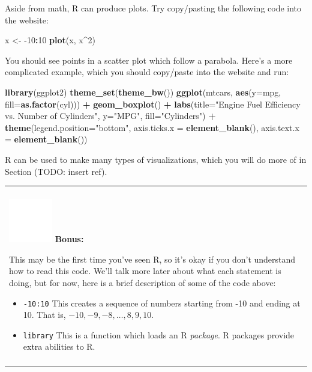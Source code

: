 \documentclass[
]{book}
\newenvironment{Shaded}{\begin{snugshade}}{\end{snugshade}}
\newcommand{\DataTypeTok}[1]{\textcolor[rgb]{0.13,0.29,0.53}{#1}}
\newcommand{\DecValTok}[1]{\textcolor[rgb]{0.00,0.00,0.81}{#1}}
\newcommand{\KeywordTok}[1]{\textcolor[rgb]{0.13,0.29,0.53}{\textbf{#1}}}
\newcommand{\NormalTok}[1]{#1}
\newcommand{\OperatorTok}[1]{\textcolor[rgb]{0.81,0.36,0.00}{\textbf{#1}}}
\newcommand{\StringTok}[1]{\textcolor[rgb]{0.31,0.60,0.02}{#1}}
\providecommand{\tightlist}{%
  \setlength{\itemsep}{0pt}\setlength{\parskip}{0pt}}
\newenvironment{bonus}
{
  \begin{center}
  \begin{tabular}{|>{\columncolor{bonus}\color{white}}p{0.9\textwidth}|}\hline\\
  \includegraphics[scale=0.1]{src/images/sun-fill-invert.png}
  \textbf{Bonus:}
}
{\\\\\hline
  \end{tabular}
  \end{center}
}
\begin{document}
Aside from math, R can produce plots. Try copy/pasting the following code into the website:

\begin{Shaded}
\begin{Highlighting}[]
\NormalTok{x <-}\StringTok{ }\DecValTok{-10}\OperatorTok{:}\DecValTok{10}
\KeywordTok{plot}\NormalTok{(x, x}\OperatorTok{^}\DecValTok{2}\NormalTok{)}
\end{Highlighting}
\end{Shaded}

You should see points in a scatter plot which follow a parabola.
Here's a more complicated example, which you should copy/paste into the website and run:

\begin{Shaded}
\begin{Highlighting}[]
\KeywordTok{library}\NormalTok{(ggplot2)}
\KeywordTok{theme_set}\NormalTok{(}\KeywordTok{theme_bw}\NormalTok{())}
\KeywordTok{ggplot}\NormalTok{(mtcars, }\KeywordTok{aes}\NormalTok{(}\DataTypeTok{y=}\NormalTok{mpg, }\DataTypeTok{fill=}\KeywordTok{as.factor}\NormalTok{(cyl))) }\OperatorTok{+}\StringTok{ }
\StringTok{  }\KeywordTok{geom_boxplot}\NormalTok{() }\OperatorTok{+}\StringTok{ }
\StringTok{  }\KeywordTok{labs}\NormalTok{(}\DataTypeTok{title=}\StringTok{"Engine Fuel Efficiency vs. Number of Cylinders"}\NormalTok{, }\DataTypeTok{y=}\StringTok{"MPG"}\NormalTok{, }\DataTypeTok{fill=}\StringTok{"Cylinders"}\NormalTok{) }\OperatorTok{+}\StringTok{ }
\StringTok{  }\KeywordTok{theme}\NormalTok{(}\DataTypeTok{legend.position=}\StringTok{"bottom"}\NormalTok{, }
        \DataTypeTok{axis.ticks.x =} \KeywordTok{element_blank}\NormalTok{(),}
        \DataTypeTok{axis.text.x =} \KeywordTok{element_blank}\NormalTok{())}
\end{Highlighting}
\end{Shaded}

R can be used to make many types of visualizations, which you will do more of in Section (TODO: insert ref).

\begin{bonus}
This may be the first time you've seen R, so it's okay if you don't
understand how to read this code. We'll talk more later about what each
statement is doing, but for now, here is a brief description of some of
the code above:

\begin{itemize}
\tightlist
\item
  \texttt{-10:10} This creates a sequence of numbers starting from -10
  and ending at 10. That is, \(-10, -9, -8, \ldots, 8, 9, 10\).
\item
  \texttt{library} This is a function which loads an R \emph{package}. R
  packages provide extra abilities to R.
\end{itemize}
\end{bonus}
\end{document}
